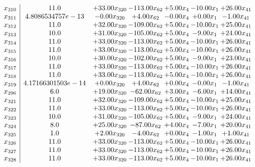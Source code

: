 \documentclass[8pt]{article}
\begin{document}
\[\begin{array}{c| c c@{\hskip 2pt} c@{\hskip 2pt} c@{\hskip 2pt} c@{\hskip 2pt} c@{\hskip 2pt} }
 x_{310}   &  11.0 & + 33.00 x_{320} & -113.00 x_{62} & +  5.00 x_{4} & -10.00 x_{1} & + 26.00 x_{41}\\
 x_{311}   &  4.8086534757e-13 & -0.00 x_{320} & +  4.00 x_{62} & -0.00 x_{4} & +  0.00 x_{1} & -1.00 x_{41}\\
 x_{312}   &  11.0 & + 32.00 x_{320} & -109.00 x_{62} & +  5.00 x_{4} & -10.00 x_{1} & + 25.00 x_{41}\\
 x_{313}   &  10.0 & + 31.00 x_{320} & -105.00 x_{62} & +  5.00 x_{4} & -9.00 x_{1} & + 24.00 x_{41}\\
 x_{314}   &  11.0 & + 33.00 x_{320} & -113.00 x_{62} & +  5.00 x_{4} & -10.00 x_{1} & + 26.00 x_{41}\\
 x_{315}   &  11.0 & + 33.00 x_{320} & -113.00 x_{62} & +  5.00 x_{4} & -10.00 x_{1} & + 26.00 x_{41}\\
 x_{316}   &  10.0 & + 30.00 x_{320} & -102.00 x_{62} & +  5.00 x_{4} & -9.00 x_{1} & + 23.00 x_{41}\\
 x_{317}   &  11.0 & + 33.00 x_{320} & -113.00 x_{62} & +  5.00 x_{4} & -10.00 x_{1} & + 26.00 x_{41}\\
 x_{318}   &  11.0 & + 33.00 x_{320} & -113.00 x_{62} & +  5.00 x_{4} & -10.00 x_{1} & + 26.00 x_{41}\\
 x_{319}   &  4.17166301503e-14 & +  0.00 x_{320} & +  4.00 x_{62} & +  0.00 x_{4} & -0.00 x_{1} & -1.00 x_{41}\\
 x_{296}   &  6.0 & + 19.00 x_{320} & -62.00 x_{62} & +  3.00 x_{4} & -6.00 x_{1} & + 14.00 x_{41}\\
 x_{321}   &  11.0 & + 32.00 x_{320} & -109.00 x_{62} & +  5.00 x_{4} & -10.00 x_{1} & + 25.00 x_{41}\\
 x_{322}   &  11.0 & + 33.00 x_{320} & -113.00 x_{62} & +  5.00 x_{4} & -10.00 x_{1} & + 26.00 x_{41}\\
 x_{323}   &  10.0 & + 31.00 x_{320} & -105.00 x_{62} & +  5.00 x_{4} & -9.00 x_{1} & + 24.00 x_{41}\\
 x_{324}   &  8.0 & + 25.00 x_{320} & -87.00 x_{62} & +  4.00 x_{4} & -7.00 x_{1} & + 20.00 x_{41}\\
 x_{325}   &  1.0 & +  2.00 x_{320} & -4.00 x_{62} & +  0.00 x_{4} & -1.00 x_{1} & +  1.00 x_{41}\\
 x_{326}   &  11.0 & + 33.00 x_{320} & -113.00 x_{62} & +  5.00 x_{4} & -10.00 x_{1} & + 26.00 x_{41}\\
 x_{327}   &  11.0 & + 33.00 x_{320} & -113.00 x_{62} & +  5.00 x_{4} & -10.00 x_{1} & + 26.00 x_{41}\\
 x_{328}   &  11.0 & + 33.00 x_{320} & -113.00 x_{62} & +  5.00 x_{4} & -10.00 x_{1} & + 26.00 x_{41}\\

\end{array}\]
\end{document}
